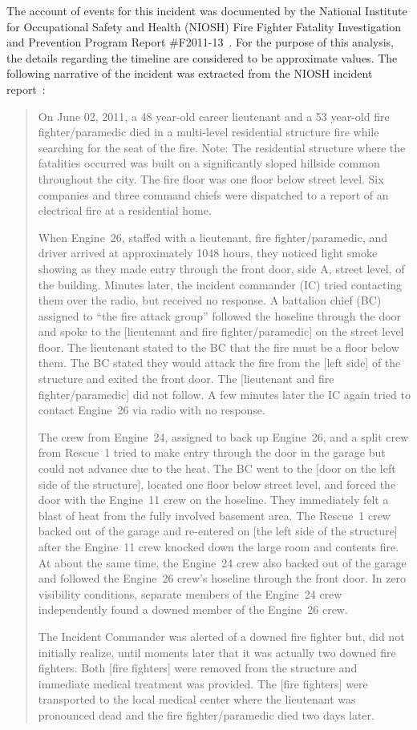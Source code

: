 \documentclass[12pt,oneside]{book}
\begin{document}
The account of events for this incident was documented by the National Institute for Occupational Safety and Health (NIOSH) Fire Fighter Fatality Investigation and Prevention Program Report \#F2011-13~\cite{NIOSH:Bowyer2}. For the purpose of this analysis, the details regarding the timeline are considered to be approximate values. The following narrative of the incident was extracted from the NIOSH incident report~\cite{NIOSH:Bowyer2}:
\begin{quote}
On June 02, 2011, a 48 year-old career lieutenant and a 53 year-old fire fighter/paramedic died in a multi-level residential structure fire while searching for the seat of the fire. Note: The residential structure where the fatalities occurred was built on a significantly sloped hillside common throughout the city. The fire floor was one floor below street level. Six companies and three command chiefs were dispatched to a report of an electrical fire at a residential home.

When Engine~26, staffed with a lieutenant, fire fighter/paramedic, and driver arrived at approximately 1048 hours, they noticed light smoke showing as they made entry through the front door, side A, street level, of the building. Minutes later, the incident commander (IC) tried contacting them over the radio, but received no response. A battalion chief (BC) assigned to ``the fire attack group'' followed the hoseline through the door and spoke to the [lieutenant and fire fighter/paramedic] on the street level floor. The lieutenant stated to the BC that the fire must be a floor below them. The BC stated they would attack the fire from the [left side] of the structure and exited the front door. The [lieutenant and fire fighter/paramedic] did not follow. A few minutes later the IC again tried to contact Engine~26 via radio with no response.

The crew from Engine~24, assigned to back up Engine~26, and a split crew from Rescue~1 tried to make entry through the door in the garage but could not advance due to the heat. The BC went to the [door on the left side of the structure], located one floor below street level, and forced the door with the Engine~11 crew on the hoseline. They immediately felt a blast of heat from the fully involved basement area. The Rescue~1 crew backed out of the garage and re-entered on [the left side of the structure] after the Engine~11 crew knocked down the large room and contents fire. At about the same time, the Engine~24 crew also backed out of the garage and followed the Engine~26 crew's hoseline through the front door. In zero visibility conditions, separate members of the Engine~24 crew independently found a downed member of the Engine~26 crew.

The Incident Commander was alerted of a downed fire fighter but, did not initially realize, until moments later that it was actually two downed fire fighters. Both [fire fighters] were removed from the structure and immediate medical treatment was provided. The [fire fighters] were transported to the local medical center where the lieutenant was pronounced dead and the fire fighter/paramedic died two days later.
\end{quote}
\end{document}
